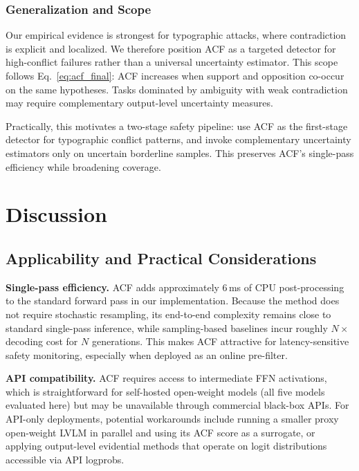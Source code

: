 \documentclass[preprint,12pt]{elsarticle}
\begin{document}
\subsubsection{Generalization and Scope}
\label{sec:misbehavior}

Our empirical evidence is strongest for typographic attacks, where contradiction is explicit and localized. We therefore position ACF as a targeted detector for high-conflict failures rather than a universal uncertainty estimator. This scope follows Eq.~\eqref{eq:acf_final}: ACF increases when support and opposition co-occur on the same hypotheses. Tasks dominated by ambiguity with weak contradiction may require complementary output-level uncertainty measures.

Practically, this motivates a two-stage safety pipeline: use ACF as the first-stage detector for typographic conflict patterns, and invoke complementary uncertainty estimators only on uncertain borderline samples. This preserves ACF's single-pass efficiency while broadening coverage.

\FloatBarrier
\section{Discussion}

\subsection{Applicability and Practical Considerations}

\textbf{Single-pass efficiency.} ACF adds approximately 6\,ms of CPU post-processing to the standard forward pass in our implementation. Because the method does not require stochastic resampling, its end-to-end complexity remains close to standard single-pass inference, while sampling-based baselines incur roughly $N\times$ decoding cost for $N$ generations. This makes ACF attractive for latency-sensitive safety monitoring, especially when deployed as an online pre-filter.

\textbf{API compatibility.} ACF requires access to intermediate FFN activations, which is straightforward for self-hosted open-weight models (all five models evaluated here) but may be unavailable through commercial black-box APIs. For API-only deployments, potential workarounds include running a smaller proxy open-weight LVLM in parallel and using its ACF score as a surrogate, or applying output-level evidential methods that operate on logit distributions accessible via API logprobs.
\end{document}
